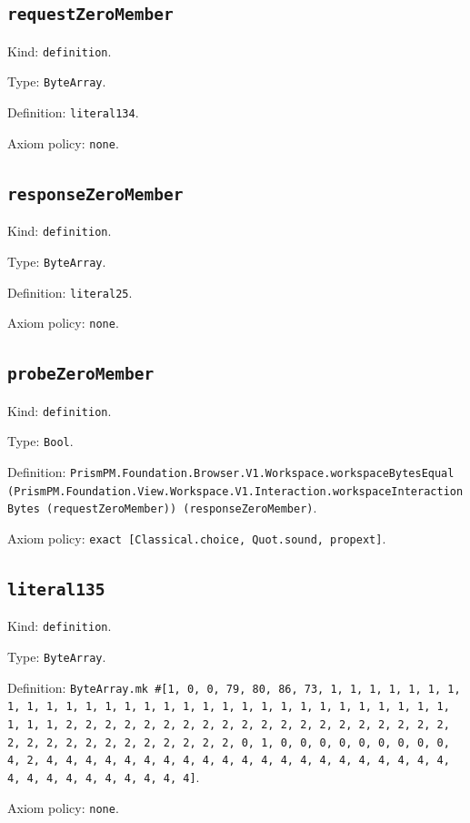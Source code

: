 \documentclass[11pt]{article}
\begin{document}
\subsection*{\texttt{requestZeroMember}}
\noindent Kind: \texttt{definition}.\par
\noindent Type: \texttt{ByteArray}.\par
\noindent Definition: \texttt{literal134}.\par
\noindent Axiom policy: \texttt{none}.\par
\subsection*{\texttt{responseZeroMember}}
\noindent Kind: \texttt{definition}.\par
\noindent Type: \texttt{ByteArray}.\par
\noindent Definition: \texttt{literal25}.\par
\noindent Axiom policy: \texttt{none}.\par
\subsection*{\texttt{probeZeroMember}}
\noindent Kind: \texttt{definition}.\par
\noindent Type: \texttt{Bool}.\par
\noindent Definition: \texttt{PrismPM.Foundation.Browser.V1.Workspace.workspaceBytesEqual (PrismPM.Foundation.View.Workspace.V1.Interaction.workspaceInteractionBytes (requestZeroMember)) (responseZeroMember)}.\par
\noindent Axiom policy: \texttt{exact [Classical.choice, Quot.sound, propext]}.\par
\subsection*{\texttt{literal135}}
\noindent Kind: \texttt{definition}.\par
\noindent Type: \texttt{ByteArray}.\par
\noindent Definition: \texttt{ByteArray.mk \#[1, 0, 0, 79, 80, 86, 73, 1, 1, 1, 1, 1, 1, 1, 1, 1, 1, 1, 1, 1, 1, 1, 1, 1, 1, 1, 1, 1, 1, 1, 1, 1, 1, 1, 1, 1, 1, 1, 1, 1, 2, 2, 2, 2, 2, 2, 2, 2, 2, 2, 2, 2, 2, 2, 2, 2, 2, 2, 2, 2, 2, 2, 2, 2, 2, 2, 2, 2, 2, 2, 2, 2, 0, 1, 0, 0, 0, 0, 0, 0, 0, 0, 0, 4, 2, 4, 4, 4, 4, 4, 4, 4, 4, 4, 4, 4, 4, 4, 4, 4, 4, 4, 4, 4, 4, 4, 4, 4, 4, 4, 4, 4, 4, 4, 4, 4]}.\par
\noindent Axiom policy: \texttt{none}.\par
\end{document}
